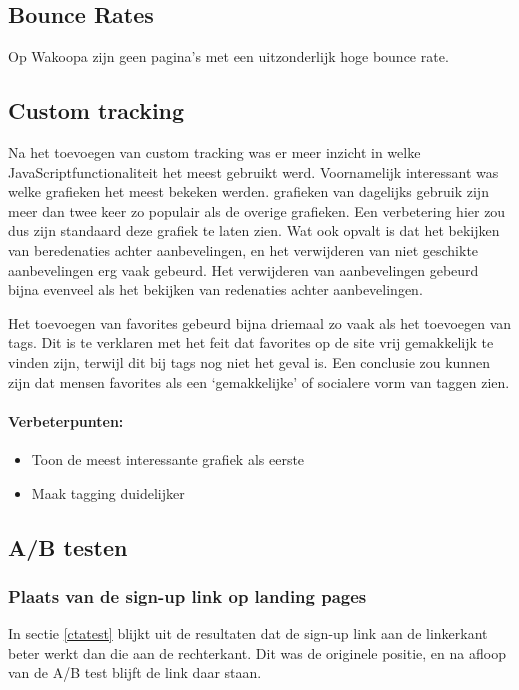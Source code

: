 \documentclass[a4paper, 10pt, pdftex]{report}
\begin{document}
    \subsection{Bounce Rates}
      Op Wakoopa zijn geen pagina's met een uitzonderlijk hoge bounce rate.

    \subsection{Custom tracking}
    Na het toevoegen van custom tracking was er meer inzicht in welke JavaScriptfunctionaliteit het meest gebruikt werd. Voornamelijk interessant was welke grafieken het meest bekeken werden. grafieken van dagelijks gebruik zijn meer dan twee keer zo populair als de overige grafieken. Een verbetering hier zou dus zijn standaard deze grafiek te laten zien. Wat ook opvalt is dat het bekijken van beredenaties achter aanbevelingen, en het verwijderen van niet geschikte aanbevelingen erg vaak gebeurd. Het verwijderen van aanbevelingen gebeurd bijna evenveel als het bekijken van redenaties achter aanbevelingen.

    Het toevoegen van favorites gebeurd bijna driemaal zo vaak als het toevoegen van tags. Dit is te verklaren met het feit dat favorites op de site vrij gemakkelijk te vinden zijn, terwijl dit bij tags nog niet het geval is. Een conclusie zou kunnen zijn dat mensen favorites als een `gemakkelijke' of socialere vorm van taggen zien.

    \paragraph{\textbf{Verbeterpunten:}}
      \begin{itemize}
        \item Toon de meest interessante grafiek als eerste
        \item Maak tagging duidelijker
      \end{itemize}

    \subsection{A/B testen}
      \subsubsection{Plaats van de sign-up link op landing pages}
        In sectie \ref{ctatest} blijkt uit de resultaten dat de sign-up link aan de linkerkant beter werkt dan die aan de rechterkant. Dit was de originele positie, en na afloop van de A/B test blijft de link daar staan.
\end{document}
